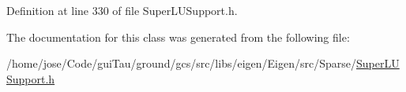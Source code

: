 Definition at line 330 of file Super\-L\-U\-Support.\-h.



The documentation for this class was generated from the following file\-:\begin{DoxyCompactItemize}
\item 
/home/jose/\-Code/gui\-Tau/ground/gcs/src/libs/eigen/\-Eigen/src/\-Sparse/\hyperlink{_super_l_u_support_8h}{Super\-L\-U\-Support.\-h}\end{DoxyCompactItemize}
